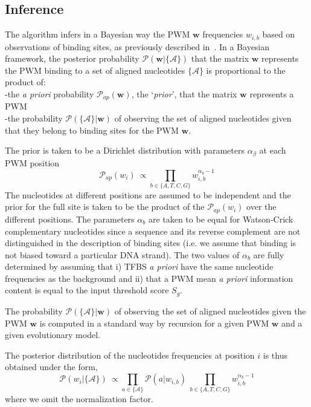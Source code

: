 \documentclass[a4,center,fleqn]{NAR}
\newcommand{\proba}{\mathcal{P}}
\begin{document}
\subsection*{Inference}

The algorithm infers in a Bayesian way the PWM $\mathbf{w}$ frequencies
$w_{i,b}$ based on observations of binding sites, as previously described
in~\cite{Rouault:2010fk}.
In a Bayesian framework,  the posterior probability
$\proba(\mathbf{w}|\{\mathcal{A}\})$ that the matrix $\mathbf{w}$ represents
the PWM binding to a set of aligned nucleotides $\{\mathcal{A}\}$ is
proportional to the product of:\\
-the {\em a priori} probability $\proba_{ap}(\mathbf{w})$, the `{\em  prior}',
that the matrix $\mathbf{w}$ represents a PWM\\
-the probability $\proba(\{\mathcal{A}\}|\mathbf{w})$ of observing the set of
aligned nucleotides given that they belong to binding sites for the PWM
$\mathbf{w}$.

The prior is taken to be a Dirichlet distribution with parameters
$\alpha_\beta$ at each PWM position
\begin{equation}
 \proba_{ap}(w_{i})\ \propto 
   \prod_{b \in \{A,T,C,G\}} w_{i,b}^{\alpha_b-1}
\end{equation}
The nucleotides at different positions are assumed to be independent and the
prior for the full site is taken to be the product of the $ \proba_{ap}(w_{i})$
over the different positions.
The parameters $\alpha_b$ are taken to be equal for Watson-Crick complementary
nucleotides since a sequence and its reverse complement are not distinguished
in the description of binding sites (i.e. we assume that binding is not biased
toward a particular DNA strand).
The two values of $\alpha_b$ are fully determined by assuming that i) TFBS {\em
a priori} have the same nucleotide frequencies as the background and ii) that
a PWM mean {\em a priori} information content is equal to the input threshold
score $S_g$.

The probability $\proba(\{\mathcal{A}\}|\mathbf{w})$ of observing the set of
aligned nucleotides given the PWM $\mathbf{w}$ is computed in a standard way
\cite{Felsenstein:1981ve} by recursion for a given PWM $\mathbf{w}$ and a given
evolutionary model.

The posterior distribution of the nucleotides frequencies at position $i$ is
thus obtained under the form,
\begin{equation}
   \proba(w_{i}|\{\mathcal{A}\})\ \propto \prod_{a \in \{\mathcal{A}\}} \proba(a|w_{i,b})\
   \prod_{b \in \{A,T,C,G\}} w_{i,b}^{\alpha_b-1}
   \label{bayes}
\end{equation}
where we omit the normalization factor.
\end{document}
